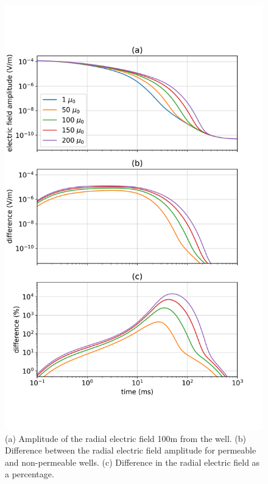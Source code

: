\begin{figure}
    \begin{center}
    \includegraphics[width=\textwidth]{figures/motivation-e-fields.png}
    \end{center}
\caption{
    (a) Amplitude of the radial electric field 100m from the well.
    (b) Difference between the radial electric field amplitude for permeable and non-permeable wells.
    (c) Difference in the radial electric field as a percentage.
}
\label{fig:motivation-e-fields}
\end{figure}



